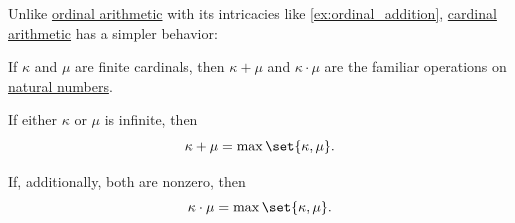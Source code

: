 \begin{proposition}\label{thm:simplified_cardinal_arithmetic}
  Unlike \hyperref[def:ordinal_arithmetic]{ordinal arithmetic} with its intricacies like \cref{ex:ordinal_addition}, \hyperref[def:cardinal_arithmetic]{cardinal arithmetic} has a simpler behavior:
  \begin{thmenum}
     If \( \kappa \) and \( \mu \) are finite cardinals, then \( \kappa + \mu \) and \( \kappa \cdot \mu \) are the familiar operations on \hyperref[def:natural_numbers]{natural numbers}.

     If either \( \kappa \) or \( \mu \) is infinite, then
    \begin{equation*}
      \kappa + \mu = \max\set{ \kappa, \mu }.
    \end{equation*}

    If, additionally, both are nonzero, then
    \begin{equation*}
      \kappa \cdot \mu = \max\set{ \kappa, \mu }.
    \end{equation*}
  \end{thmenum}
\end{proposition}
